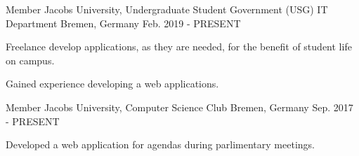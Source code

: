 

\begin{cventries}

  \cventry
    {Member} %
    {Jacobs University, Undergraduate Student Government (USG) IT Department} %
    {Bremen, Germany} %
    {Feb. 2019 - PRESENT} %
    {
      \begin{cvitems} %
        \item {Freelance develop applications, as they are needed, for the benefit of student life on campus.}
        \item {Gained experience developing a web applications.}
      \end{cvitems}
    }
  \cventry
    {Member} %
    {Jacobs University, Computer Science Club} %
    {Bremen, Germany} %
    {Sep. 2017 - PRESENT} %
    {
      \begin{cvitems} %
        \item {Developed a web application for agendas during parlimentary meetings.}
      \end{cvitems}
    }
\end{cventries}
